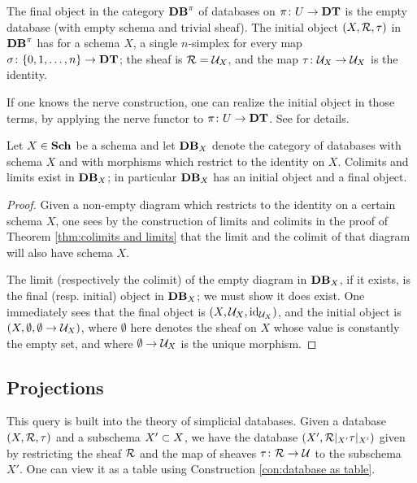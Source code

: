 \documentclass{amsart}
\begin{document}
\begin{remark}

The final object in the category $\Data^\pi$ of databases on $\pi\taking U\to\DT$ is the empty database (with empty schema and trivial sheaf).  The initial object $(X,\mcR,\tau)$ in $\Data^\pi$ has for a schema $X$, a single $n$-simplex for every map $\sigma\taking\{0,1,\ldots,n\}\to\DT$; the sheaf is $\mcR=\mcU_X$, and the map $\tau\taking\mcU_X\to\mcU_X$ is the identity.

If one knows the \Cech nerve construction, one can realize the initial object in those terms, by applying the \Cech nerve functor to $\pi\taking U\to\DT$.  See \cite[3.1]{Spi} for details.

\end{remark}

\begin{corollary}\label{cor:colimits and limits}

Let $X\in\Sch$ be a schema and let $\Data_X$ denote the category of databases with schema $X$ and with morphisms which restrict to the identity on $X$.  Colimits and limits exist in $\Data_X$; in particular $\Data_X$ has an initial object and a final object.

\end{corollary}

\begin{proof}

Given a non-empty diagram which restricts to the identity on a certain schema $X$, one sees by the construction of limits and colimits in the proof of Theorem \ref{thm:colimits and limits} that the limit and the colimit of that diagram will also have schema $X$.  

The limit (respectively the colimit) of the empty diagram in $\Data_X$, if it exists, is the final (resp. initial) object in $\Data_X$; we must show it does exist.  One immediately sees that the final object is $(X,\mcU_X,\id_{\mcU_X})$, and the initial object is $(X,\emptyset,\emptyset\to\mcU_X)$, where $\emptyset$ here denotes the sheaf on $X$ whose value is constantly the empty set, and where $\emptyset\to\mcU_X$ is the unique morphism.


\end{proof}

\subsection{Projections}\label{subsec:projections}

This query is built into the theory of simplicial databases.  Given a database $(X,\mcR,\tau)$ and a subschema $X'\ss X$, we have the database $(X',\mcR|_{X'}\tau|_{X'})$ given by restricting the sheaf $\mcR$ and the map of sheaves $\tau\taking\mcR\to\mcU$ to the subschema $X'$.  One can view it as a table using Construction \ref{con:database as table}.
\end{document}
